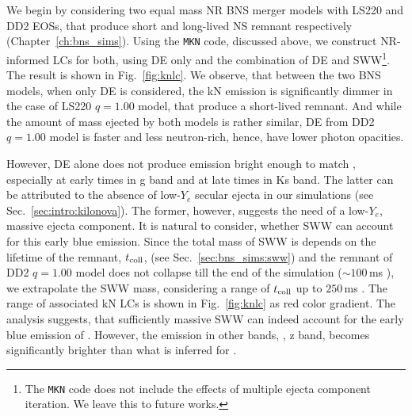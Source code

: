 We begin by considering two equal mass \ac{NR} \ac{BNS} merger models with LS220 
and DD2 \acp{EOS}, that produce short and long-lived \ac{NS} remnant respectively
(Chapter~\ref{ch:bns_sims}). 
Using the \texttt{MKN} code, discussed above, we construct \ac{NR}-informed 
\acp{LC} for both, using \ac{DE} only and the combination of \ac{DE} and \ac{SWW}\footnote{
    The \texttt{MKN} code does not include the effects of multiple ejecta component 
    iteration. We leave this to future works.
}. 
The result is shown in Fig.~\ref{fig:knlc}. We observe, that between the two 
\ac{BNS} models, when only \ac{DE} is considered, the \ac{kN} emission is 
significantly dimmer in the case of LS220 $q=1.00$ model, that produce a 
short-lived remnant.
And while the amount of mass ejected by both models is rather similar,  
\ac{DE} from DD2 $q=1.00$ model is faster and less neutron-rich, hence, 
have lower photon opacities. 

However, \ac{DE} alone does not produce emission bright enough to 
match \AT{}, especially at early times in g band and at late times in Ks band. 
The latter can be attributed to the absence of low-$Y_e$ secular ejecta in 
our simulations (see Sec.~\ref{sec:intro:kilonova}). The former, however, 
suggests the need of a low-$Y_e$, massive ejecta component. 
%
It is natural to consider, whether \ac{SWW} can account for this early 
blue emission. Since the total mass of \ac{SWW} is depends on the 
lifetime of the remnant, $t_{\rm coll}$, (see Sec.~\ref{sec:bns_sims:sww}) 
and the remnant of DD2 $q=1.00$ model does not collapse till the end of 
the simulation (${\sim}100\,$ms \pmerg{}), we extrapolate the \ac{SWW} mass, 
considering a range of $t_{\rm coll}$ up to $250\,$ms \pmerg{}. The range of 
associated \ac{kN} \acp{LC} is shown in Fig.~\ref{fig:knlc} as red color gradient. 
%
The analysis suggests, that sufficiently massive \ac{SWW} can indeed 
account for the early blue emission of \AT{}. However, the emission 
in other bands, \eg, z band, becomes significantly brighter than what is 
inferred for \AT{}. 


